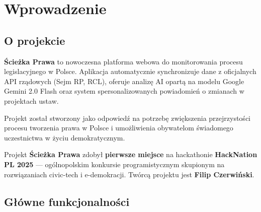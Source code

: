 \documentclass[12pt,a4paper]{article}
\begin{document}
\tableofcontents
\newpage

\section{Wprowadzenie}

\subsection{O projekcie}

\textbf{Ścieżka Prawa} to nowoczesna platforma webowa do monitorowania procesu legislacyjnego w Polsce. Aplikacja automatycznie synchronizuje dane z oficjalnych API rządowych (Sejm RP, RCL), oferuje analizę AI opartą na modelu Google Gemini 2.0 Flash oraz system spersonalizowanych powiadomień o zmianach w projektach ustaw.

Projekt został stworzony jako odpowiedź na potrzebę zwiększenia przejrzystości procesu tworzenia prawa w Polsce i umożliwienia obywatelom świadomego uczestnictwa w życiu demokratycznym.

\begin{hackbox}
Projekt \textbf{Ścieżka Prawa} zdobył \textbf{pierwsze miejsce} na hackathonie \textbf{HackNation PL 2025} — ogólnopolskim konkursie programistycznym skupionym na rozwiązaniach civic-tech i e-demokracji. Twórcą projektu jest \textbf{Filip Czerwiński}.
\end{hackbox}

\subsection{Główne funkcjonalności}
\end{document}
